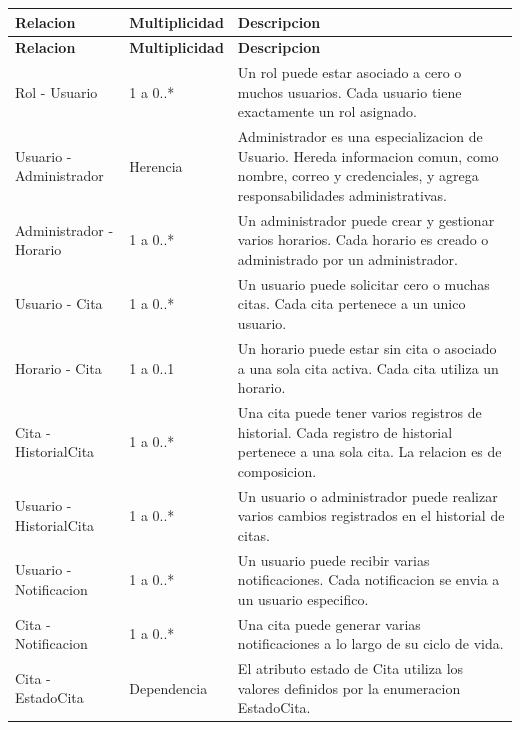 \documentclass[12pt,letterpaper]{article}
\begin{document}
\begin{longtable}{|p{4.2cm}|p{3cm}|p{7.3cm}|}
\hline
\textbf{Relacion} & \textbf{Multiplicidad} & \textbf{Descripcion} \\
\hline
\endfirsthead
\hline
\textbf{Relacion} & \textbf{Multiplicidad} & \textbf{Descripcion} \\
\hline
\endhead
\hline
\endfoot
\hline
\endlastfoot

Rol - Usuario & 1 a 0..* & Un rol puede estar asociado a cero o muchos usuarios. Cada usuario tiene exactamente un rol asignado. \\
\hline

Usuario - Administrador & Herencia & Administrador es una especializacion de Usuario. Hereda informacion comun, como nombre, correo y credenciales, y agrega responsabilidades administrativas. \\
\hline

Administrador - Horario & 1 a 0..* & Un administrador puede crear y gestionar varios horarios. Cada horario es creado o administrado por un administrador. \\
\hline

Usuario - Cita & 1 a 0..* & Un usuario puede solicitar cero o muchas citas. Cada cita pertenece a un unico usuario. \\
\hline

Horario - Cita & 1 a 0..1 & Un horario puede estar sin cita o asociado a una sola cita activa. Cada cita utiliza un horario. \\
\hline

Cita - HistorialCita & 1 a 0..* & Una cita puede tener varios registros de historial. Cada registro de historial pertenece a una sola cita. La relacion es de composicion. \\
\hline

Usuario - HistorialCita & 1 a 0..* & Un usuario o administrador puede realizar varios cambios registrados en el historial de citas. \\
\hline

Usuario - Notificacion & 1 a 0..* & Un usuario puede recibir varias notificaciones. Cada notificacion se envia a un usuario especifico. \\
\hline

Cita - Notificacion & 1 a 0..* & Una cita puede generar varias notificaciones a lo largo de su ciclo de vida. \\
\hline

Cita - EstadoCita & Dependencia & El atributo estado de Cita utiliza los valores definidos por la enumeracion EstadoCita. \\
\hline
\end{longtable}
\end{document}
